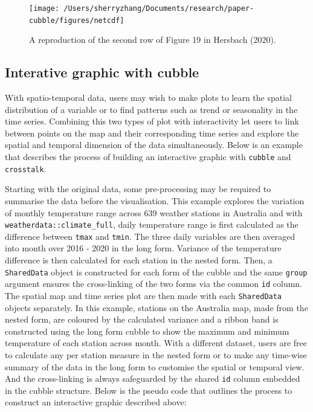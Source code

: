 \documentclass[
]{jss}
\begin{document}
\begin{CodeChunk}
\begin{figure}

{\centering \texttt{[image: /Users/sherryzhang/Documents/research/paper-cubble/figures/netcdf]} 

}

\caption[A reproduction of the second row of Figure 19 in  Hersbach (2020)]{A reproduction of the second row of Figure 19 in  Hersbach (2020).}\label{fig:netcdf}
\end{figure}
\end{CodeChunk}

\hypertarget{interative-graphic-with-cubble}{%
\subsection{Interative graphic with
cubble}\label{interative-graphic-with-cubble}}

With spatio-temporal data, users may wish to make plots to learn the
spatial distribution of a variable or to find patterns such as trend or
seasonality in the time series. Combining this two types of plot with
interactivity let users to link between points on the map and their
corresponding time series and explore the spatial and temporal dimension
of the data simultaneously. Below is an example that describes the
process of building an interactive graphic with \texttt{cubble} and
\texttt{crosstalk}.

Starting with the original data, some pre-processing may be required to
summarise the data before the visualisation. This example explores the
variation of monthly temperature range across 639 weather stations in
Australia and with \texttt{weatherdata::climate\_full}, daily
temperature range is first calculated as the difference between
\texttt{tmax} and \texttt{tmin}. The three daily variables are then
averaged into month over 2016 - 2020 in the long form. Variance of the
temperature difference is then calculated for each station in the nested
form. Then, a \texttt{SharedData} object is constructed for each form of
the cubble and the same \texttt{group} argument ensures the
cross-linking of the two forms via the common \texttt{id} column. The
spatial map and time series plot are then made with each
\texttt{SharedData} objects separately. In this example, stations on the
Australia map, made from the nested form, are coloured by the calculated
variance and a ribbon band is constructed using the long form cubble to
show the maximum and minimum temperature of each station across month.
With a different dataset, users are free to calculate any per station
measure in the nested form or to make any time-wise summary of the data
in the long form to customise the spatial or temporal view. And the
cross-linking is always safeguarded by the shared \texttt{id} column
embedded in the cubble structure. Below is the pseudo code that outlines
the process to construct an interactive graphic described above:
\end{document}
